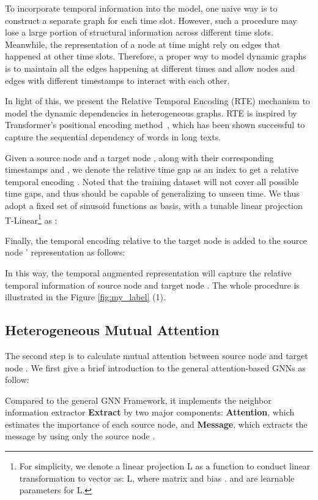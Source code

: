 \documentclass[sigconf]{acmart}
\theoremstyle{definition}
\begin{document}
{To incorporate temporal information into the model, one naive way is to construct a separate graph for each time slot. However, such a procedure may lose a large portion of structural information across different time slots. 
Meanwhile, the representation of a node at time  might rely on edges that happened at other time slots. 
Therefore, a proper way to model dynamic graphs is to maintain all the edges happening at different times and allow nodes and edges with different timestamps to interact with each other.

In light of this, we present the Relative Temporal Encoding (RTE) mechanism to model the dynamic dependencies in heterogeneous graphs. 
RTE is inspired by Transformer's positional encoding method~\cite{DBLP:conf/nips/VaswaniSPUJGKP17, DBLP:conf/naacl/ShawUV18}, which has been shown successful to capture the sequential dependency of words in long texts. 

Given a source node  and a target node , along with their corresponding timestamps  and , we denote the relative time gap  as an index to get a relative temporal encoding . Noted that the training dataset will not cover all possible time gaps, and thus   should be capable of generalizing to unseen time. We thus adopt a fixed set of sinusoid functions as basis, with a tunable linear projection T-Linear\footnote{For simplicity, we denote a linear projection L  as a function to conduct linear transformation to vector  as: L, where matrix  and bias .  and  are learnable parameters for L.} as :

Finally, the temporal encoding relative to the target node  is added to the source node ' representation as follows:

In this way, the temporal augmented representation  will capture the relative temporal information of source node  and target node . The whole procedure is illustrated in the Figure \ref{fig:my_label} (1). 



\subsection{Heterogeneous Mutual Attention}

The second step is to calculate mutual attention between source node  and target node . We first give a brief introduction to the general attention-based GNNs as follow: 

Compared to the general GNN Framework, it implements the neighbor information extractor \textbf{Extract} by two major components: \textbf{Attention}, which estimates the importance of each source node, and \textbf{Message}, which extracts the message by using only the source node .

}
\end{document}
